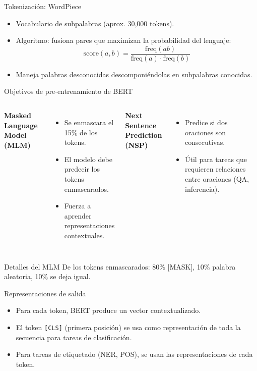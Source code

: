 \documentclass[aspectratio=169, 10pt, xcolor=table]{beamer}
\begin{document}
\begin{frame}{Tokenización: WordPiece}
    \begin{itemize}
        \item Vocabulario de subpalabras (aprox. 30,000 tokens).
        \item Algoritmo: fusiona pares que maximizan la probabilidad del lenguaje:
        \[
        \text{score}(a,b) = \frac{\text{freq}(ab)}{\text{freq}(a) \cdot \text{freq}(b)}
        \]
        \item Maneja palabras desconocidas descomponiéndolas en subpalabras conocidas.
    \end{itemize}
\end{frame}

\begin{frame}{Objetivos de pre-entrenamiento de BERT}
    \begin{columns}[t]
        \textbf{Masked Language Model (MLM)}
        \begin{itemize}
            \item Se enmascara el 15\% de los tokens.
            \item El modelo debe predecir los tokens enmascarados.
            \item Fuerza a aprender representaciones contextuales.
        \end{itemize}
        \textbf{Next Sentence Prediction (NSP)}
        \begin{itemize}
            \item Predice si dos oraciones son consecutivas.
            \item Útil para tareas que requieren relaciones entre oraciones (QA, inferencia).
        \end{itemize}
    \end{columns}
    \vspace{0.3cm}
    \begin{exampleblock}{Detalles del MLM}
        De los tokens enmascarados: 80\% [MASK], 10\% palabra aleatoria, 10\% se deja igual.
    \end{exampleblock}
\end{frame}

\begin{frame}{Representaciones de salida}
    \begin{itemize}
        \item Para cada token, BERT produce un vector contextualizado.
        \item El token \texttt{[CLS]} (primera posición) se usa como representación de toda la secuencia para tareas de clasificación.
        \item Para tareas de etiquetado (NER, POS), se usan las representaciones de cada token.
    \end{itemize}
\end{frame}
\end{document}
